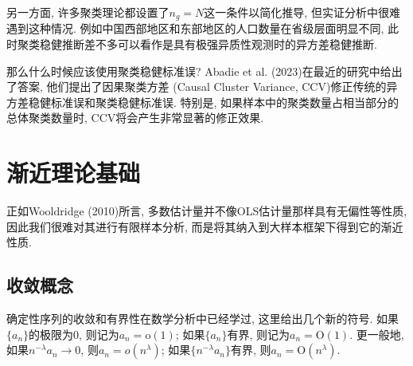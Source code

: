 \documentclass[cn, 12pt, math=mtpro2, bibstyle=apa, blue, twocol]{elegantbook}
\begin{document}
另一方面, 许多聚类理论都设置了$n_g=N$这一条件以简化推导, 但实证分析中很难遇到这种情况. 例如中国西部地区和东部地区的人口数量在省级层面明显不同, 此时聚类稳健推断差不多可以看作是具有极强异质性观测时的异方差稳健推断.

那么什么时候应该使用聚类稳健标准误? Abadie et al. (2023)在最近的研究中给出了答案, 他们提出了因果聚类方差 (Causal Cluster Variance, CCV)修正传统的异方差稳健标准误和聚类稳健标准误. 特别是, 如果样本中的聚类数量占相当部分的总体聚类数量时, CCV将会产生非常显著的修正效果.


\chapter{渐近理论基础}
 正如Wooldridge (2010)所言, 多数估计量并不像OLS估计量那样具有无偏性等性质, 因此我们很难对其进行有限样本分析, 而是将其纳入到大样本框架下得到它的渐近性质.
\section{收敛概念}
确定性序列的收敛和有界性在数学分析中已经学过, 这里给出几个新的符号. 如果$\{a_n\}$的极限为0, 则记为$a_n=\text{o}(1)$; 如果$\{a_n\}$有界, 则记为$a_n=\text{O}(1)$. 更一般地, 如果$n^{-\lambda}a_n\to0$, 则$a_n=o(n^\lambda)$; 如果$\{n^{-\lambda}a_n\}$有界, 则$a_n=\text{O}(n^\lambda)$.
\end{document}
